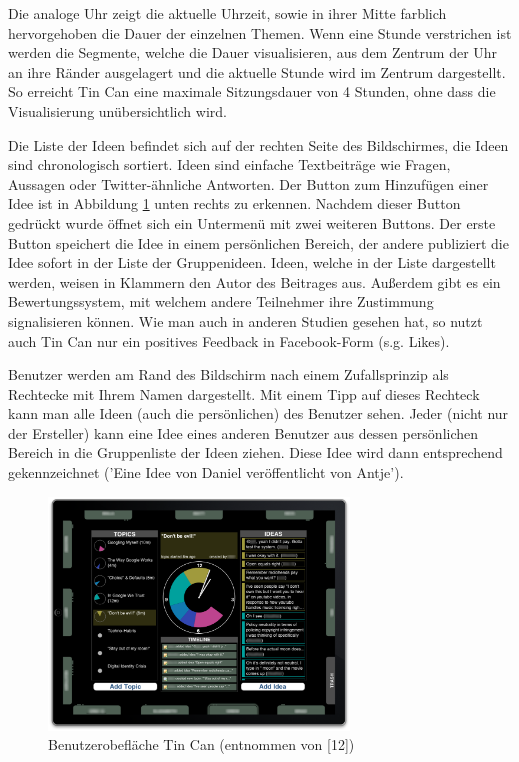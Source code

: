 Die analoge Uhr zeigt die aktuelle Uhrzeit, sowie in ihrer Mitte farblich
hervorgehoben die Dauer der einzelnen Themen.
Wenn eine Stunde verstrichen ist werden die Segmente, welche die Dauer
visualisieren, aus dem Zentrum der Uhr an ihre Ränder ausgelagert und die
aktuelle Stunde wird im Zentrum dargestellt. So erreicht Tin Can eine maximale
Sitzungsdauer von 4 Stunden, ohne dass die Visualisierung unübersichtlich wird.

Die Liste der Ideen befindet sich auf der rechten Seite des Bildschirmes, die
Ideen sind chronologisch sortiert. Ideen sind einfache Textbeiträge wie Fragen,
Aussagen oder Twitter-ähnliche Antworten. Der Button zum Hinzufügen einer Idee
ist in Abbildung \ref{tincan_ui} unten rechts zu erkennen. Nachdem dieser Button
gedrückt wurde öffnet sich ein Unt\-er\-menü mit zwei weiteren Buttons. Der erste
Button speichert die Idee in einem persönlichen Bereich, der andere publiziert
die Idee sofort in der Liste der Gruppenideen.
Ideen, welche in der Liste dargestellt werden, weisen in Klammern den Autor
des Beitrages aus. Außerdem gibt es ein Bewertungssystem, mit welchem andere
Teilnehmer ihre Zustimmung signalisieren können. Wie man auch in anderen Studien
\cite{HarGorSch2012}\cite{KimChaHolPent2008}
gesehen hat, so nutzt auch Tin Can nur ein positives Feedback in Facebook-Form
(s.g. Likes).

Benutzer werden am Rand des Bildschirm nach einem Zufallsprinzip als Rechtecke
mit Ihrem Namen dargestellt. Mit einem Tipp auf dieses Rechteck kann man alle
Ideen (auch die persönlichen) des Benutzer sehen. Jeder (nicht nur der
Ersteller) kann eine Idee eines anderen Benutzer aus dessen persönlichen
Bereich in die Gruppenliste der Ideen ziehen. Diese Idee wird dann
entsprechend gekennzeichnet ('Eine Idee von Daniel veröffentlicht von Antje').

\begin{figure}[htp]
\centering
\includegraphics[width=8cm]{tincan_ui.png}
\caption{Benutzerobefläche Tin Can (entnommen von [12])}
\label{tincan_ui}
\end{figure}


